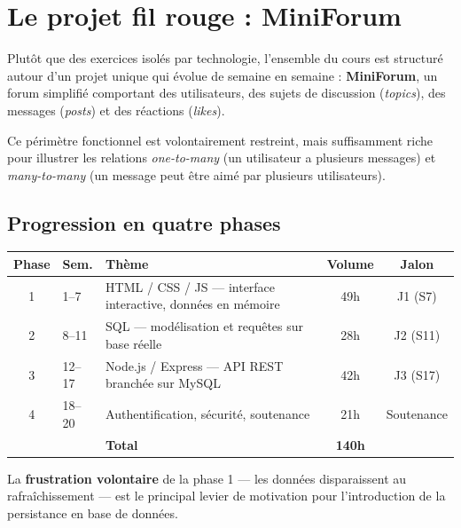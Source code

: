 \documentclass[a4paper,11pt]{article}
\begin{document}
\newpage

\section{Le projet fil rouge : MiniForum}

Plutôt que des exercices isolés par technologie, l'ensemble du cours est structuré autour d'un projet unique qui évolue de semaine en semaine : \textbf{MiniForum}, un forum simplifié comportant des utilisateurs, des sujets de discussion (\textit{topics}), des messages (\textit{posts}) et des réactions (\textit{likes}).

Ce périmètre fonctionnel est volontairement restreint, mais suffisamment riche pour illustrer les relations \textit{one-to-many} (un utilisateur a plusieurs messages) et \textit{many-to-many} (un message peut être aimé par plusieurs utilisateurs).

\subsection{Progression en quatre phases}

\begin{center}
\begin{tabularx}{\linewidth}{clXcc}
  \toprule
  \rowcolor{accentBlue}
  \color{white}\textbf{Phase} &
  \color{white}\textbf{Sem.} &
  \color{white}\textbf{Thème} &
  \color{white}\textbf{Volume} &
  \color{white}\textbf{Jalon} \\
  \midrule
  \rowcolor{cfptGrey}
  1 & 1--7   & HTML / CSS / JS — interface interactive, données en mémoire & 49h & J1 (S7) \\
  2 & 8--11  & SQL — modélisation et requêtes sur base réelle & 28h & J2 (S11) \\
  \rowcolor{cfptGrey}
  3 & 12--17 & Node.js / Express — API REST branchée sur MySQL & 42h & J3 (S17) \\
  4 & 18--20 & Authentification, sécurité, soutenance & 21h & Soutenance \\
  \midrule
  \rowcolor{accentBlue!15}
  & & \textbf{Total} & \textbf{140h} & \\
  \bottomrule
\end{tabularx}
\end{center}

La \textbf{frustration volontaire} de la phase 1 — les données disparaissent au rafraîchissement — est le principal levier de motivation pour l'introduction de la persistance en base de données.
\end{document}

